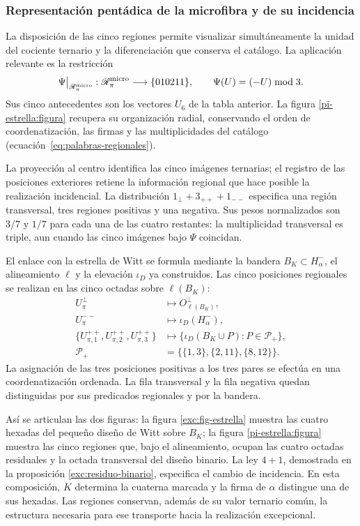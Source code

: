 \subsubsection{Representación pentádica de la microfibra y de su incidencia}
\label{pi-estrella:desarrollo}

La disposición de las cinco regiones permite visualizar simultáneamente
la unidad del cociente ternario y la diferenciación que conserva el
catálogo. La aplicación relevante es la restricción
\[
 \Psi\big|_{\mathscr R_\pi^{\rm micro}}:
 \mathscr R_\pi^{\rm micro}\longrightarrow\{010211\},
 \qquad \Psi(U)=(-U)\bmod3.
\]
Sus cinco antecedentes son los vectores \(U_6\) de la tabla anterior.
La figura \ref{pi-estrella:figura} recupera su organización radial,
conservando el orden de coordenatización, las firmas y las multiplicidades del
catálogo (ecuación~\eqref{eq:palabras-regionales}).



La proyección al centro identifica las cinco imágenes ternarias; el
registro de las posiciones exteriores retiene la información regional
que hace posible la realización incidencial. La distribución
\(1_\perp+3_{++}+1_{--}\) especifica una región transversal, tres
regiones positivas y una negativa. Sus pesos normalizados son
\(3/7\) y \(1/7\) para cada una de las cuatro restantes: la
multiplicidad transversal es triple, aun cuando las cinco imágenes bajo
\(\Psi\) coincidan.

El enlace con la estrella de Witt se formula mediante la bandera
\(B_K\subset H^-_\alpha\), el alineamiento \(\ell\) y la
elevación \(\iota_D\) ya construidos. Las cinco posiciones regionales
se realizan en las cinco octadas sobre \(\ell(B_K)\):
\[
\begin{aligned}
 U_\pi^\perp&\longmapsto O^\perp_{\ell(B_K)},\\
 U_\pi^{--}&\longmapsto\iota_D(H^-_\alpha),\\
 \{U_{\pi,1}^{++},U_{\pi,2}^{++},U_{\pi,3}^{++}\}
 &\longmapsto
 \{\iota_D(B_K\cup P):P\in\mathcal P_+\},\\
 \mathcal P_+&=\bigl\{\{1,3\},\{2,11\},\{8,12\}\bigr\}.
\end{aligned}
\]
La asignación de las tres posiciones positivas a los tres pares se
efectúa en una coordenatización ordenada. La fila transversal y la fila negativa
quedan distinguidas por sus predicados regionales y por la bandera.

Así se articulan las dos figuras: la figura
\ref{exc:fig-estrella} muestra las cuatro hexadas del pequeño diseño
de Witt sobre \(B_K\); la figura \ref{pi-estrella:figura} muestra
las cinco regiones que, bajo el alineamiento, ocupan las cuatro octadas
residuales y la octada transversal del diseño binario. La ley
\(4+1\), demostrada en la proposición
\ref{exc:residuo-binario}, especifica el cambio de incidencia. En esta
composición, \(K\) determina la cuaterna marcada y la firma de
\(\alpha\) distingue una de sus hexadas. Las regiones conservan,
además de su valor ternario común, la estructura necesaria para ese
transporte hacia la realización excepcional.
